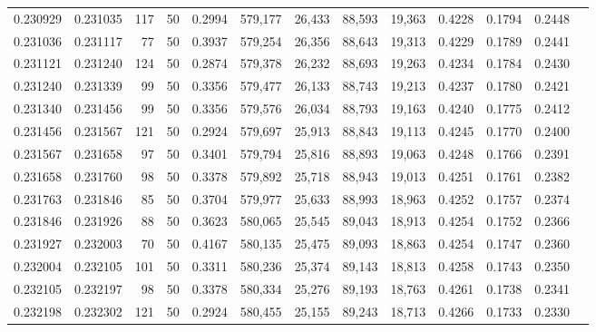 \begin{tabular}{rrrrrrrrrrrrr}
0.230929 & 0.231035 &   117 &  50 &                                     0.2994 & 579,177 &  26,433 &  88,593 &  19,363 & 0.4228 & 0.1794 & 0.2448 \\
0.231036 & 0.231117 &    77 &  50 &                                     0.3937 & 579,254 &  26,356 &  88,643 &  19,313 & 0.4229 & 0.1789 & 0.2441 \\
0.231121 & 0.231240 &   124 &  50 &                                     0.2874 & 579,378 &  26,232 &  88,693 &  19,263 & 0.4234 & 0.1784 & 0.2430 \\
0.231240 & 0.231339 &    99 &  50 &                                     0.3356 & 579,477 &  26,133 &  88,743 &  19,213 & 0.4237 & 0.1780 & 0.2421 \\
0.231340 & 0.231456 &    99 &  50 &                                     0.3356 & 579,576 &  26,034 &  88,793 &  19,163 & 0.4240 & 0.1775 & 0.2412 \\
0.231456 & 0.231567 &   121 &  50 &                                     0.2924 & 579,697 &  25,913 &  88,843 &  19,113 & 0.4245 & 0.1770 & 0.2400 \\
0.231567 & 0.231658 &    97 &  50 &                                     0.3401 & 579,794 &  25,816 &  88,893 &  19,063 & 0.4248 & 0.1766 & 0.2391 \\
0.231658 & 0.231760 &    98 &  50 &                                     0.3378 & 579,892 &  25,718 &  88,943 &  19,013 & 0.4251 & 0.1761 & 0.2382 \\
0.231763 & 0.231846 &    85 &  50 &                                     0.3704 & 579,977 &  25,633 &  88,993 &  18,963 & 0.4252 & 0.1757 & 0.2374 \\
0.231846 & 0.231926 &    88 &  50 &                                     0.3623 & 580,065 &  25,545 &  89,043 &  18,913 & 0.4254 & 0.1752 & 0.2366 \\
0.231927 & 0.232003 &    70 &  50 &                                     0.4167 & 580,135 &  25,475 &  89,093 &  18,863 & 0.4254 & 0.1747 & 0.2360 \\
0.232004 & 0.232105 &   101 &  50 &                                     0.3311 & 580,236 &  25,374 &  89,143 &  18,813 & 0.4258 & 0.1743 & 0.2350 \\
0.232105 & 0.232197 &    98 &  50 &                                     0.3378 & 580,334 &  25,276 &  89,193 &  18,763 & 0.4261 & 0.1738 & 0.2341 \\
0.232198 & 0.232302 &   121 &  50 &                                     0.2924 & 580,455 &  25,155 &  89,243 &  18,713 & 0.4266 & 0.1733 & 0.2330 \\

\end{tabular}
